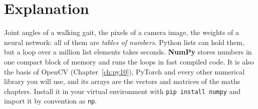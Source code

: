 \label{ch:py8}

\section*{Explanation}
Joint angles of a walking gait, the pixels of a camera image, the weights of a neural network: all of them are \emph{tables of numbers}. Python lists can hold them, but a loop over a million list elements takes seconds. \textbf{NumPy} stores numbers in one compact block of memory and runs the loops in fast compiled code. It is also the basis of OpenCV (Chapter~\ref{ch:py10}), PyTorch and every other numerical library you will use, and its arrays are the vectors and matrices of the maths chapters. Install it in your virtual environment with \verb!pip install numpy! and import it by convention as \texttt{np}.

